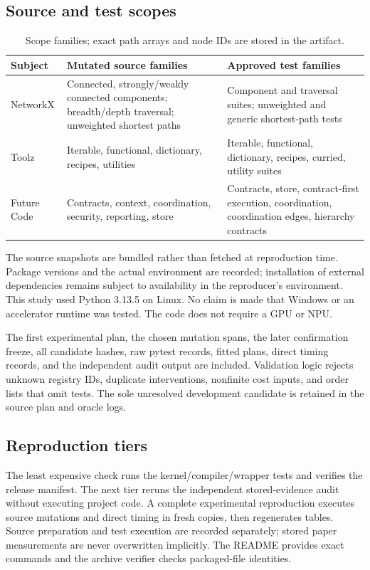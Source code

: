 \subsection{Source and test scopes}
\begin{table}[h]
\centering\small
\caption{Scope families; exact path arrays and node IDs are stored in the artifact.}
\begin{tabularx}{\linewidth}{@{}p{.17\linewidth}XX@{}}
\toprule
Subject & Mutated source families & Approved test families\\
\midrule
NetworkX & Connected, strongly/weakly connected components; breadth/depth traversal; unweighted shortest paths & Component and traversal suites; unweighted and generic shortest-path tests\\
Toolz & Iterable, functional, dictionary, recipes, utilities & Iterable, functional, dictionary, recipes, curried, utility suites\\
Future Code & Contracts, context, coordination, security, reporting, store & Contracts, store, contract-first execution, coordination, coordination edges, hierarchy contracts\\
\bottomrule
\end{tabularx}
\end{table}

The source snapshots are bundled rather than fetched at reproduction time. Package versions and the actual environment are recorded; installation of external dependencies remains subject to availability in the reproducer's environment. This study used Python 3.13.5 on Linux. No claim is made that Windows or an accelerator runtime was tested. The code does not require a GPU or NPU.

The first experimental plan, the chosen mutation spans, the later confirmation freeze, all candidate hashes, raw pytest records, fitted plans, direct timing records, and the independent audit output are included. Validation logic rejects unknown registry IDs, duplicate interventions, nonfinite cost inputs, and order lists that omit tests. The sole unresolved development candidate is retained in the source plan and oracle logs.

\subsection{Reproduction tiers}
The least expensive check runs the kernel/compiler/wrapper tests and verifies the release manifest. The next tier reruns the independent stored-evidence audit without executing project code. A complete experimental reproduction executes source mutations and direct timing in fresh copies, then regenerates tables. Source preparation and test execution are recorded separately; stored paper measurements are never overwritten implicitly. The README provides exact commands and the archive verifier checks packaged-file identities.

